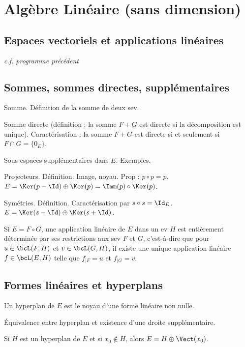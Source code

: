 \documentclass[a4paper,french,bookmarks]{article}
\begin{document}

\section*{Algèbre Linéaire (sans dimension)}

\subsection*{Espaces vectoriels et applications linéaires}

\textit{c.f. programme précédent}

\subsection*{Sommes, sommes directes, supplémentaires}

\begin{enumerate}
    \ithand Somme. Définition de la somme de deux sev.
    
    \ithand Somme directe (définition : la somme $F + G$ est directe si
    la décomposition est unique). Caractérisation : la somme $F + G$ est
    directe si et seulement si $F \cap G = \{0_E\}$.

    \ithand Sous-espaces supplémentaires dans $E$. Exemples.
    
    \ithand Projecteurs. Définition. Image, noyau. Prop : $p \circ p =
    p$. \quad $E = \Ker(p - \Id) \oplus \Ker(p) = \Imm (p) \circ \Ker
    (p)$.
    
    \ithand Symétries. Définition. Caractérisation par $s \circ s =
    \Id_E$. \quad $E = \Ker(s - \Id) \oplus \Ker(s + \Id)$.
    
    \ithand Si $E = F \circ G$, une application linéaire de $E$ dans un
    ev $H$ est entièrement déterminée par ses restrictions aux sev $F$
    et $G$, c'est-à-dire que pour $u \in \bcL(F, H)$ et $v \in \bcL(G,
    H)$, il existe une unique application linéaire $f \in \bcL(E, H)$
    telle que $f_{\vert F} = u$ et $f_{\vert G} = v$.
\end{enumerate}

\subsection*{Formes linéaires et hyperplans}

\begin{enumerate}
    \ithand Un hyperplan de $E$ est le noyau d’une forme linéaire non
    nulle.
    
    \ithand Équivalence entre hyperplan et existence d’une droite
    supplémentaire.

    \ithand Si $H$ est un hyperplan de $E$ et si $x_0 \not\in H$, alors
    $E = H \oplus \Vect(x_0)$.
\end{enumerate}
\end{document}
